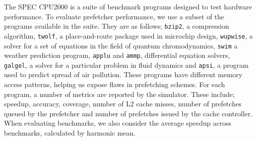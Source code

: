 The SPEC CPU2000\cite{bib:cpu2000} is a suite of benchmark programs designed to test hardware performance.
To evaluate prefetcher performance, we use a subset of the programs available in the suite.
They are as follows; \texttt{bzip2}, a compression algorithm, \texttt{twolf},
a place-and-route package used in microchip design, \texttt{wupwise}, a solver for a set of
equations in the field of quantum chromodynamics, \texttt{swim} a weather prediction program,
\texttt{applu} and \texttt{ammp}, differential equation solvers, \texttt{galgel}, a solver for a
particular problem in fluid dynamics and \texttt{apsi}, a program used to predict spread of air pollution.
These programs have different memory access patterns, helping us expose flaws in prefetching schemes.
For each program, a number of metrics are reported by the simulator.
These include; speedup, accuracy, coverage, number of L2 cache misses, number of prefetches queued by the prefetcher and number of prefetches issued by the cache controller.
When evaluating benchmarks, we also consider the average speedup across benchmarks, calculated by harmonic mean.
